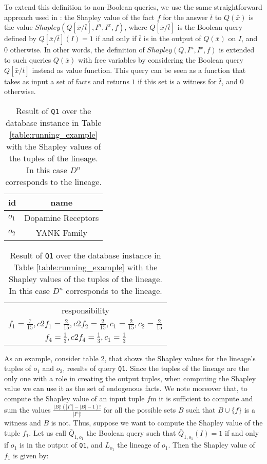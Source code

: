 To extend this definition to non-Boolean queries, we use the same straightforward approach used in \citet{DFKM22}: the Shapley value of the fact $f$ for the answer $\bar{t}$ to $Q(\bar{x})$ is the value $Shapley(Q[\bar{x} / \bar{t}], I^n, I^x, f)$, where $Q[\bar{x} / \bar{t}]$ is the Boolean query defined by $Q[\bar{x} / \bar{t}](I) = 1$ if and only if $\bar{t}$ is in the output of $Q(\bar{x})$ on $I$, and $0$ otherwise.
In other words, the definition of $Shapley(Q, I^n, I^x, f)$ is extended to such queries $Q(\bar{x})$ with free variables by considering the Boolean query $Q[\bar{x} / \bar{t}]$ instead as value function. This query can be seen as a function that takes as input a set of facts and returns $1$ if this set is a witness for $\bar{t}$, and $0$ otherwise.

\begin{table}[]
\footnotesize
\centering
  \begin{tabular}{|l|c|}
  \hline
    id & name\\
    \hline
    $o_1$ &  Dopamine Receptors\\
    $o_2$ & YANK Family\\
    \hline
  \end{tabular}
  \begin{tabular}{c}
  	responsibility   \\
  	$f_1=\frac{7}{15}, c2f_1=\frac{2}{15}, c2f_2=\frac{2}{15}, c_1=\frac{2}{15}, c_2=\frac{2}{15}$ \\
  	$f_4=\frac{1}{3}, c2f_4=\frac{1}{3}, c_1=\frac{1}{3}$ \\
  \end{tabular}
    \caption{Result of \texttt{Q1} over the database instance in Table \ref{table:running_example} with the Shapley values of the tuples of the lineage. In this case $D^n$ corresponds to the lineage.}
  \label{table:result_shapley}
\end{table} 

As an example, consider table \ref{table:result_shapley}, that shows the Shapley values for the lineage's tuples of $o_1$ and $o_2$, results of query \texttt{Q1}. 
Since the tuples of the lineage are the only one with a role in creating the output tuples, when computing the Shapley value we can use it as the set of endogenous facts.
We note moreover that, to compute the Shapley value of an input tuple $f$m it is sufficient to compute and sum the values $\frac{|B|!(|I^n| - |B| - 1)!}{|I^n|!}$ for all the possible sets $B$ such that $B \cup \{f\}$ is a witness and $B$ is not. 
Thus, suppose we want to compute the Shapley value of the tuple $f_1$. Let us call $\bar{Q}_{1, o_1}$ the Boolean query such that $\bar{Q}_{1, o_1}(I) = 1$ if and only if $o_1$ is in the output of \texttt{Q1}, and $L_{o_1}$ the lineage of $o_1$.
Then the Shapley value of $f_1$ is given by:

